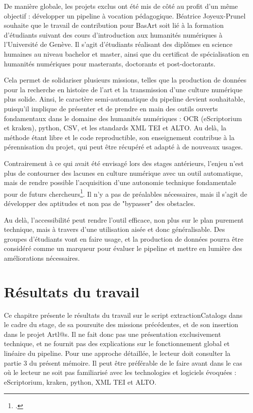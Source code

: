\documentclass[a4paper,12pt,twoside]{book}
\begin{document}
De manière globale, les projets exclus ont été mis de côté au profit d'un même objectif : développer un pipeline à vocation pédagogique. Béatrice Joyeux-Prunel souhaite que le travail de contribution pour BasArt soit lié à la formation d'étudiants suivant des cours d'introduction aux humanités numériques à l'Université de Genève. Il s'agit d'étudiants réalisant des diplômes en science humaines au niveau bachelor et master, ainsi que du certificat de spécialisation en humanités numériques pour masterants, doctorants et post-doctorants. 

Cela permet de solidariser plusieurs missions, telles que la production de données pour la recherche en histoire de l'art et la transmission d'une culture numérique plus solide. Ainsi, le caractère semi-automatique du pipeline devient souhaitable, puisqu'il implique de présenter et de prendre en main des outils ouverts fondamentaux dans le domaine des humanités numériques : OCR (eScriptorium et kraken), python, CSV, et les standards XML TEI et ALTO. Au delà, la méthode étant libre et le code reproductible, son enseignement contribue à la pérennisation du projet, qui peut être récupéré et adapté à de nouveaux usages. 

Contrairement à ce qui avait été envisagé lors des stages antérieurs, l'enjeu n'est plus de contourner des lacunes en culture numérique avec un outil automatique, mais de rendre possible l'acquisition d'une autonomie technique fondamentale pour de futurs chercheurs\footcite{debouyEnseignerHumanitesNumeriques2020}. Il n'y a pas de préalables nécessaires, mais il s'agit de développer des aptitudes et non pas de "bypasser" des obstacles. 

Au delà, l'accessibilité peut rendre l'outil efficace, non plus sur le plan purement technique, mais à travers d'une utilisation aisée et donc généralisable. Des groupes d'étudiants vont en faire usage, et la production de données pourra être considéré comme un marqueur pour évaluer le pipeline et mettre en lumière des améliorations nécessaires. 









\chapter{Résultats du travail}

Ce chapitre présente le résultats du travail sur le script extractionCatalogs dans le cadre du stage, de sa poursuite des missions précédentes, et de son insertion dans le projet Artl@s. Il ne fait donc pas une présentation exclusivement technique, et ne fournit pas des explications sur le fonctionnement global et linéaire du pipeline. Pour une approche détaillée, le lecteur doit consulter la partie 3 du présent mémoire. Il peut être préférable de le faire avant dans le cas où le lecteur ne soit pas familiarisé avec les technologies et logiciels évoquées : eScriptorium, kraken, python, XML TEI et ALTO. 
\end{document}
